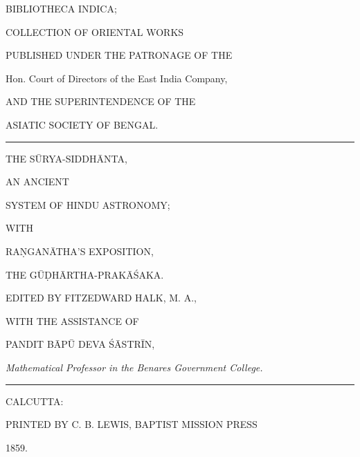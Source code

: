 \documentclass[11pt, openany]{book}
\begin{document}
 

\cfoot{}

\begin{center}
{BIBLIOTHECA INDICA;}

\vspace{1cm}


{COLLECTION OF ORIENTAL WORKS }

\vspace{3mm}

{\small{PUBLISHED UNDER THE PATRONAGE OF THE}}\\
\vspace{3mm}

 Hon. Court of Directors of the East India Company,
\vspace{3mm}
 

{\small{AND THE SUPERINTENDENCE OF THE}}
\vspace{3mm}


 ASIATIC SOCIETY OF BENGAL.
\vspace{1cm}


 \rule{8em}{.5pt}

\vspace{1cm}

 THE SŪRYA-SIDDHĀNTA, 
 \vspace{3mm}
 
{\small{AN ANCIENT}} 
\vspace{3mm}

 SYSTEM OF HINDU ASTRONOMY;
\vspace{3mm}

{\small{WITH }}
\vspace{3mm}

 RA\d{N}GANĀTHA'S EXPOSITION, 
\vspace{3mm}

 THE GŪḌHĀRTHA-PRAKĀŚAKA.
 \vspace{3mm}

{\small{ EDITED BY FITZEDWARD HALK, M. A., }}
 \vspace{3mm}
 
{\small{ WITH THE ASSISTANCE OF}}
\vspace{3mm}

{\small{ PANDIT BĀPŪ DEVA ŚĀSTRĪN,}}
\vspace{3mm}

{\small{\textenglish{\emph{Mathematical Professor in the Benares Government College.}}}}




\vfil


  \rule{8em}{.5pt}

CALCUTTA:
\vspace{3mm}

{\small{PRINTED BY C. B. LEWIS, BAPTIST MISSION PRESS }}
\vspace{3mm}

{\small{1859.}}

\end{center}
\end{document}

